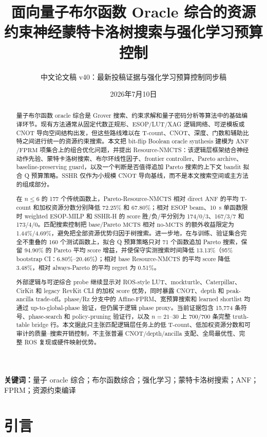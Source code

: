 \documentclass[UTF8,fontset=macnew,11pt]{ctexart}
\title{面向量子布尔函数 Oracle 综合的资源约束神经蒙特卡洛树搜索与强化学习预算控制}
\author{中文论文稿 v40：最新投稿证据与强化学习预算控制同步稿}
\date{2026年7月10日}
\newcommand{\method}{Resource-NMCTS}
\newcommand{\anf}{\ensuremath{\mathrm{ANF}}}
\newcommand{\fprm}{\ensuremath{\mathrm{FPRM}}}
\newcommand{\mcts}{\ensuremath{\mathrm{MCTS}}}
\begin{document}
\pagestyle{plain}
\maketitle

\begin{abstract}
量子布尔函数 oracle 综合是 Grover 搜索、约束求解和量子密码分析等算法中的基础编译环节。现有方法通常从固定代数正规形、ESOP/LUT/XAG 逻辑网络、可逆模板或 CNOT 导向空间结构出发，但这些路线难以在 T-count、CNOT、深度、门数和辅助比特之间进行统一的资源约束搜索。本文把 bit-flip Boolean oracle synthesis 建模为 \anf{}/\fprm{} 项集合上的组合优化问题，并提出 \method{}：该逻辑层框架结合神经动作先验、蒙特卡洛树搜索、布尔环线性因子、frontier controller、Pareto archive、baseline-preserving guard，以及一个判断是否值得追加 Pareto 搜索的上下文 bandit 拟合 Q 预算策略。SSHR 仅作为小规模 CNOT 导向基线，而不是本文搜索空间或主方法的组成部分。

在 $n\leq6$ 的 177 个传统函数上，Pareto-\method{} 相对 direct \anf{} 的平均 T-count 和加权资源分数分别降低 72.25\% 和 67.80\%；相对 ESOP beam、10~s 单函数限时 weighted ESOP-MILP 和 SSHR-H 的 score 胜/负/平分别为 174/0/3、167/3/7 和 173/4/0。匹配搜索控制把 base/Pareto \mcts{} 相对 no-\mcts{} 的额外收益限定为 1.44\%/4.69\%，避免把全部资源优势归因于树搜索。进一步地，在与训练、验证集合完全不重叠的 160 个测试函数上，拟合 Q 预算策略只对 71 个函数追加 Pareto 搜索，保留 94.90\% 的 Pareto 平均 score 增益，并使保守实测搜索时间降低 13.13\%（95\% bootstrap CI：6.80\%--20.46\%）；相对 base \method{} 的平均 score 降低 3.48\%，相对 always-Pareto 的平均 regret 为 0.51\%。

外部逻辑与可逆综合 probe 继续显示对 ROS-style LUT、mockturtle、Caterpillar、CirKit 和 legacy RevKit CLI 的加权 score 优势，同时暴露 CNOT、depth 和 peak-ancilla trade-off。phase/Rz 分支中的 Affine-FPRM、宽预算搜索和 learned shortlist 均通过 up-to-global-phase 验证，但仍属于逻辑 phase proxy。当前证据包含 15,774 条符号、phase-search 和 policy-pruning 验证行，以及 $n=21$--$30$ 上 700/700 条完整 truth-table bridge 行。本文据此只主张匹配逻辑层任务上的低 T-count、低加权资源分数和可审计的质量--搜索开销控制，不主张普遍 CNOT/depth/ancilla 支配、全局最优性、完整 ROS 复现或硬件映射优势。
\end{abstract}

\noindent\textbf{关键词：}量子 oracle 综合；布尔函数综合；强化学习；蒙特卡洛树搜索；ANF；FPRM；资源约束编译

\section{引言}
\end{document}
